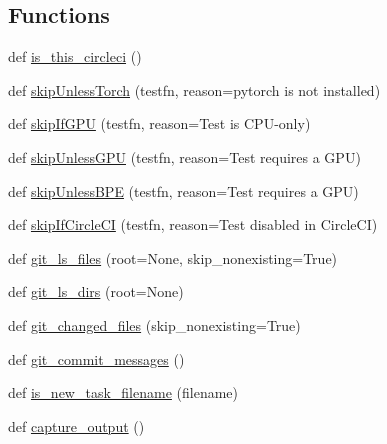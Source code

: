 \subsection*{Functions}
\begin{DoxyCompactItemize}
\item 
def \hyperlink{namespaceparlai_1_1utils_1_1testing_a2b1aba8cb2afc498691840f4b8999420}{is\+\_\+this\+\_\+circleci} ()
\item 
def \hyperlink{namespaceparlai_1_1utils_1_1testing_a7b182622aebc6cdc41ee3b99ebe47432}{skip\+Unless\+Torch} (testfn, reason=\textquotesingle{}pytorch is not installed\textquotesingle{})
\item 
def \hyperlink{namespaceparlai_1_1utils_1_1testing_a2d3bb5013e210bf866032aedc812859b}{skip\+If\+G\+PU} (testfn, reason=\textquotesingle{}Test is C\+PU-\/only\textquotesingle{})
\item 
def \hyperlink{namespaceparlai_1_1utils_1_1testing_a2773d8b6d4631fa1f639dde415eb3e2b}{skip\+Unless\+G\+PU} (testfn, reason=\textquotesingle{}Test requires a G\+PU\textquotesingle{})
\item 
def \hyperlink{namespaceparlai_1_1utils_1_1testing_ab04af7a525a569f29b936b54b32899b7}{skip\+Unless\+B\+PE} (testfn, reason=\textquotesingle{}Test requires a G\+PU\textquotesingle{})
\item 
def \hyperlink{namespaceparlai_1_1utils_1_1testing_a056ab7a9ad687500924a29001a7d9264}{skip\+If\+Circle\+CI} (testfn, reason=\textquotesingle{}Test disabled in Circle\+CI\textquotesingle{})
\item 
def \hyperlink{namespaceparlai_1_1utils_1_1testing_a50b91b6f209eeedd93ae7ec0e790b121}{git\+\_\+ls\+\_\+files} (root=None, skip\+\_\+nonexisting=True)
\item 
def \hyperlink{namespaceparlai_1_1utils_1_1testing_a767a8ac6ea27697e6f782d7375d94933}{git\+\_\+ls\+\_\+dirs} (root=None)
\item 
def \hyperlink{namespaceparlai_1_1utils_1_1testing_a2e61f8f35b8ccf518e3561a224781ced}{git\+\_\+changed\+\_\+files} (skip\+\_\+nonexisting=True)
\item 
def \hyperlink{namespaceparlai_1_1utils_1_1testing_aa9971204bea89f174596698b2e736214}{git\+\_\+commit\+\_\+messages} ()
\item 
def \hyperlink{namespaceparlai_1_1utils_1_1testing_a18092382f94848a52ef19248aa39f7ca}{is\+\_\+new\+\_\+task\+\_\+filename} (filename)
\item 
def \hyperlink{namespaceparlai_1_1utils_1_1testing_ab00d4d693202afab92c06387aa50699b}{capture\+\_\+output} ()

\end{DoxyCompactItemize}
